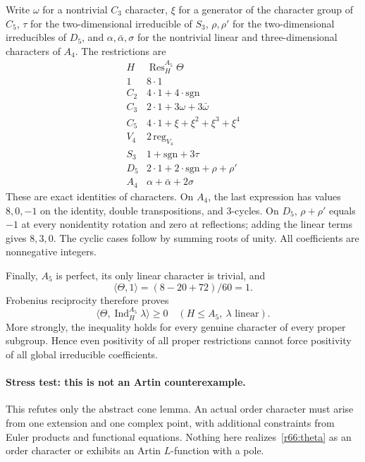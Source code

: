 \documentclass[11pt,a4paper]{article}
\numberwithin{equation}{section}
\begin{document}
Write $\omega$ for a nontrivial $C_3$ character, $\xi$ for a generator of the character group of $C_5$, $\tau$ for the two-dimensional irreducible of $S_3$, $\rho,\rho'$ for the two-dimensional irreducibles of $D_5$, and $\alpha,\bar\alpha,\sigma$ for the nontrivial linear and three-dimensional characters of $A_4$. The restrictions are
\[
\begin{array}{c|l}
 H&\operatorname{Res}^{A_5}_H\Theta\\ \hline
 1&8\cdot1\\
 C_2&4\cdot1+4\cdot\mathrm{sgn}\\
 C_3&2\cdot1+3\omega+3\bar\omega\\
 C_5&4\cdot1+\xi+\xi^2+\xi^3+\xi^4\\
 V_4&2\,\mathrm{reg}_{V_4}\\
 S_3&1+\mathrm{sgn}+3\tau\\
 D_5&2\cdot1+2\cdot\mathrm{sgn}+\rho+\rho'\\
 A_4&\alpha+\bar\alpha+2\sigma
\end{array}
\]
These are exact identities of characters. On $A_4$, the last expression has values $8,0,-1$ on the identity, double transpositions, and $3$-cycles. On $D_5$, $\rho+\rho'$ equals $-1$ at every nonidentity rotation and zero at reflections; adding the linear terms gives $8,3,0$. The cyclic cases follow by summing roots of unity. All coefficients are nonnegative integers.

Finally, $A_5$ is perfect, its only linear character is trivial, and
\[
 \langle\Theta,1\rangle=(8-20+72)/60=1.
\]
Frobenius reciprocity therefore proves
\begin{equation}\label{r66:alltests}
 \langle\Theta,\operatorname{Ind}_H^{A_5}\lambda\rangle\ge0
 \quad(H\le A_5,\ \lambda\text{ linear}).
\end{equation}
More strongly, the inequality holds for every genuine character of every proper subgroup. Hence even positivity of all proper restrictions cannot force positivity of all global irreducible coefficients.

\paragraph{Stress test: this is not an Artin counterexample.}
This refutes only the abstract cone lemma. An actual order character must arise from one extension and one complex point, with additional constraints from Euler products and functional equations. Nothing here realizes~\eqref{r66:theta} as an order character or exhibits an Artin $L$-function with a pole.
\end{document}
